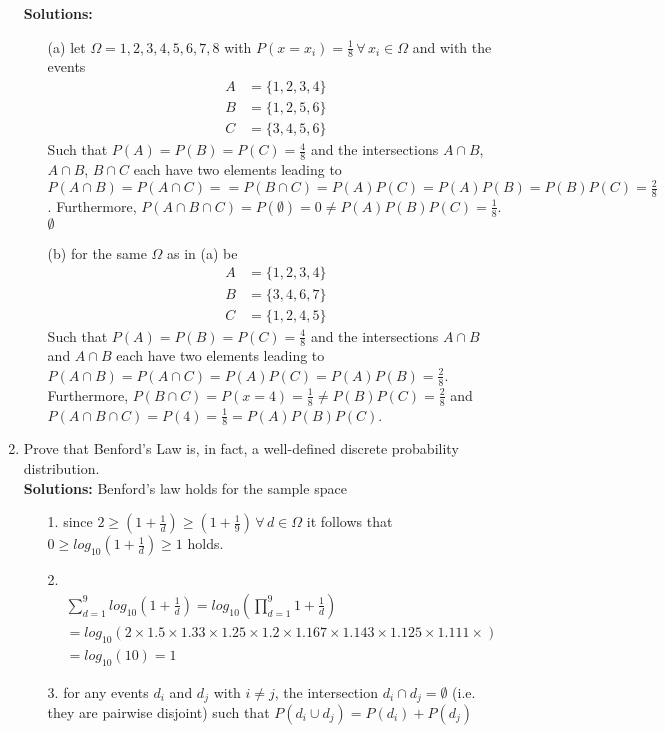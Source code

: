 \documentclass[letterpaper,12pt]{article}
\theoremstyle{definition}
\begin{document}
\begin{enumerate}
\textbf{Solutions:}\\
\begin{itemize}
\item[(a)]  let $\Omega={1,2,3,4,5,6,7,8}$ with $P(x=x_i)=\frac{1}{8}\,  \forall \, x_i \in \Omega$ and with the events
\begin{align*}
A &= \lbrace 1, 2, 3, 4\rbrace \\
 B&=\lbrace1, 2, 5, 6 \rbrace \\
 C&=\lbrace 3, 4, 5, 6 \rbrace
\end{align*}
Such that $P(A)=P(B)=P(C)=\frac{4}{8}$ and the intersections $A  \cap B$, $A  \cap B$, $B \cap C $  each have two elements leading to  $P(A  \cap B) = P(A  \cap C) = =P(B \cap C )= P(A)P(C) = P(A)P(B) = P(B)P(C) = \frac{2}{8}$. Furthermore, $P(A  \cap B \cap C) = P(\emptyset) = 0 \neq P(A)P(B)P(C) = \frac{1}{8}$.
$\emptyset$
\item[(b)] for the same $\Omega$ as in (a) be 
\begin{align*}
A &= \lbrace 1, 2, 3, 4\rbrace \\
 B&=\lbrace3, 4, 6, 7 \rbrace \\
 C&=\lbrace 1, 2, 4, 5 \rbrace
\end{align*}
Such that $P(A)=P(B)=P(C)=\frac{4}{8}$ and the intersections $A  \cap B$ and $A  \cap B$  each have two elements leading to  $P(A  \cap B) = P(A  \cap C) = P(A)P(C) = P(A)P(B) = \frac{2}{8}$. Furthermore, $P(B  \cap C) = P(x=4) = \frac{1}{8}\neq P(B)P(C) = \frac{2}{8}$ and $P(A  \cap B \cap C) = P(4) = \frac{1}{8} = P(A)P(B)P(C)$.
\end{itemize}

   	\item Prove that Benford's Law is, in fact, a well-defined discrete probability distribution.\\

\textbf{Solutions:} 
Benford's law holds for the sample space
\begin{itemize}
\item[1.] since $2 \geq (1+\frac{1}{d}) \geq (1+\frac{1}{9}) \, \forall \, d \in \Omega$ it follows that $0 \geq log_{10}(1+\frac{1}{d}) \geq 1$ holds.
\item[2.] \begin{align*}
&\sum_{d=1}^9 log_{10} \left(1+\frac{1}{d}\right )=log_{10}\left(\prod^9_{d=1}1+\frac{1}{d} \right)\\
&=log_{10}(
  2 \times
1.5\times
1.33\times
1.25\times
1.2\times
1.167\times
1.143\times
1.125\times
1.111\times)\\
 &= log_{10}(10)=1
\end{align*}
\item[3.] for any events $d_i$ and $d_j$ with $i\neq j$, the intersection $d_i \cap d_j = \emptyset$ (i.e. they are pairwise disjoint) such that $P(d_i \cup d_j)=P(d_i)+P(d_j)$
\end{itemize}


\end{enumerate}
\end{document}
